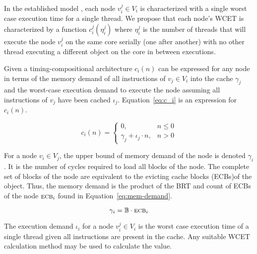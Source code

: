 In the established model \addcite, each node ${v_i^j \in V_i}$ is characterized
with a single worst case execution time for a single thread. We
propose that each node's WCET is characterized by a function
${c_i^j(\eta_i^j)}$ where ${\eta_i^j}$ is the number of threads that will execute the
node ${v_i^j}$ on the same core serially (one after another) with no
other thread executing a different object on the core in between executions.

Given a timing-compositional architecture
${c_i(n)}$ can be expressed for any node in terms of the memory demand of all instructions
of ${v_j \in V_i}$ into the cache ${\gamma_j}$ and the worst-case execution demand
to execute the node assuming all instructions of ${v_j}$ have
been cached ${\iota_j}$. Equation~\ref{eq:c_i} is an expression for
${c_i(n)}$. 
 
\begin{equation}
  \label{eq:c_i}
  c_i(n) = \begin{cases}
    0, & n \le 0 \\
    \gamma_j + \iota_j \cdot n, & n > 0
  \end{cases}
\end{equation}

For a node ${v_i \in V_j}$, the upper bound of memory demand of the node is denoted ${\gamma_i}$. It is the number of cycles required to load all blocks of the node. The complete set of blocks of the node are equivalent to the evicting cache blocks (ECBs) of the object. Thus, the memory demand is the product of the BRT and count of ECBs of the node ${\textsc{ecb}_i}$ found in Equation~\ref{eq:mem-demand}.

\begin{equation}{\label{eq:mem-demand}}
    \gamma_i = \mathbb{B} \cdot \textsc{ecb}_i
\end{equation}

The execution demand ${\iota_i}$ for a node ${v_i^j \in V_i}$ is the worst case execution time of a single thread given all instructions are present in the cache. Any suitable WCET calculation method {\addcite} may be used to calculate the value.

